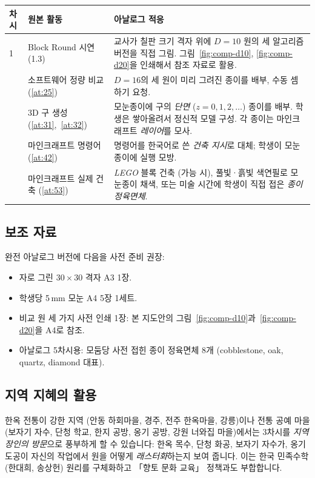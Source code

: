 \documentclass[12pt,a4paper]{scrartcl}
\begin{document}
\begin{center}
\small
\begin{tabularx}{\textwidth}{@{}p{}p{}X@{}}
\toprule
\textbf{차시} & \textbf{원본 활동} & \textbf{아날로그 적응} \\
\midrule
1 & Block Round 시연 (1.3) & 교사가 칠판 크기 격자 위에 $D = 10$ 원의 세 알고리즘 버전을 직접 그림. 그림~\ref{fig:comp-d10}, \ref{fig:comp-d20}을 인쇄해서 참조 자료로 활용. \\
\addlinespace[3pt]
2 & 소프트웨어 정량 비교 (\ref{at:25}) & $D = 16$의 세 원이 미리 그려진 종이를 배부, 수동 셈하기 요청. \\
\addlinespace[3pt]
3 & 3D 구 생성 (\ref{at:31},~\ref{at:32}) & 모눈종이에 구의 \emph{단면} ($z = 0, 1, 2, \ldots$) 종이를 배부. 학생은 쌓아올려서 정신적 모델 구성. 각 종이는 마인크래프트 \emph{레이어}를 모사. \\
\addlinespace[3pt]
4 & 마인크래프트 명령어 (\ref{at:42}) & 명령어를 한국어로 쓴 \emph{건축 지시}로 대체; 학생이 모눈종이에 실행 모방. \\
\addlinespace[3pt]
5 & 마인크래프트 실제 건축 (\ref{at:53}) & \emph{LEGO} 블록 건축 (가능 시), 풀빛·흙빛 색연필로 모눈종이 채색, 또는 미술 시간에 학생이 직접 접은 \emph{종이 정육면체}. \\
\bottomrule
\end{tabularx}
\end{center}

\subsection{보조 자료}
완전 아날로그 버전에 다음을 사전 준비 권장:
\begin{itemize}[leftmargin=1.3em,itemsep=0.1em,topsep=0.2em,nosep]
  \item 자로 그린 $30 \times 30$ 격자 A3 1장.
  \item 학생당 5\,mm 모눈 A4 5장 1세트.
  \item 비교 원 세 가지 사전 인쇄 1장: 본 지도안의 그림~\ref{fig:comp-d10}과~\ref{fig:comp-d20}을 A4로 참조.
  \item 아날로그 5차시용: 모둠당 사전 접힌 종이 정육면체 8개 (cobblestone, oak, quartz, diamond 대표).
\end{itemize}

\subsection{지역 지혜의 활용}
한옥 전통이 강한 지역 (안동 하회마을, 경주, 전주 한옥마을, 강릉)이나 전통 공예 마을 (보자기 자수, 단청 학교, 한지 공방, 옹기 공방, 강원 너와집 마을)에서는 3차시를 \emph{지역 장인의 방문}으로 풍부하게 할 수 있습니다: 한옥 목수, 단청 화공, 보자기 자수가, 옹기 도공이 자신의 작업에서 원을 어떻게 \emph{래스터화}하는지 보여 줍니다. 이는 한국 민족수학 (한대희, 송상헌) 원리를 구체화하고 「향토 문화 교육」 정책과도 부합합니다.
\end{document}
